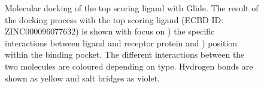 \documentclass[11pt, letterpaper, titlepage]{article}
\begin{document}
\clearpage
\pagebreak

\begin{figure}[h]
	\centering
	\captionsetup[subfigure]{skip=-20pt,position=top,labelfont=bf,labelformat=parens,singlelinecheck=false}
	\caption{Molecular docking of the top scoring ligand with Glide. The result of the docking process with the top scoring ligand (ECBD ID: ZINC000096077632) is shown with focus on ) the specific interactions between ligand and receptor protein and ) position within the binding pocket. The different interactions between the two molecules are coloured depending on type. Hydrogen bonds are shown as yellow and salt bridges as violet.}\label{fig:docking_EOS100380}
\end{figure}
\end{document}
